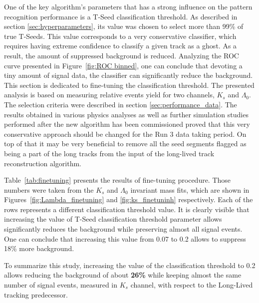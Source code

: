 One of the key algorithm's parameters that has a strong influence on the pattern recognition performance is a T-Seed classification threshold. As described in section \ref{sec:hyperparameters}, its value was chosen to select more than 99\% of true T-Seeds. This value corresponds to a very conservative classifier, which requires having extreme confidence to classify a given track as a ghost. As a result, the amount of suppressed background is reduced. Analyzing the ROC curve presented in Figure~\ref{fig:ROC binned}, one can conclude that devoting a tiny amount of signal data, the classifier can significantly reduce the background. This section is dedicated to fine-tuning the classification threshold. The presented analysis is based on measuring relative events yield for two channels, $K_s$ and $\Lambda_0$. The selection criteria were described in section \ref{sec:performance_data}. The results obtained in various physics analyses as well as further simulation studies performed after the new algorithm has been commissioned proved that this very conservative approach should be changed for the Run 3 data taking period. On top of that it may be very beneficial to remove all the seed segments flagged as being a part of the long tracks from the input of the long-lived track reconstruction algorithm. 

Table~\ref{tab:finetuning} presents the results of fine-tuning procedure. Those numbers were taken from the $K_s$ and $\Lambda_0$ invariant mass fits, which are shown in Figures~\ref{fig:Lambda_finetuning} and \ref{fig:ks_finetuninh} respectively. Each of the rows represents a different classification threshold value. It is clearly visible that increasing the value of T-Seed classification threshold parameter allows significantly reduces the background while preserving almost all signal events. One can conclude that increasing this value from 0.07 to 0.2 allows to suppress 18\% more background.  

To summarize this study, increasing the value of the classification threshold to 0.2 allows reducing the background of about \textbf{ 26\%} while keeping almost the same number of signal events, measured in $K_s$ channel, with respect to the Long-Lived tracking predecessor. 

